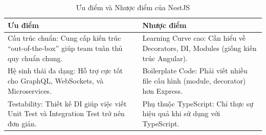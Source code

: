 \documentclass[12pt,a4paper]{report}
\begin{document}
\begin{table}[H]
\centering
\caption{Ưu điểm và Nhược điểm của NestJS}
\label{tab:nestjs_pros_cons}
\begin{tabularx}{\textwidth}{|X|X|}
\hline
\textbf{Ưu điểm} & \textbf{Nhược điểm} \\ \hline
Cấu trúc chuẩn: Cung cấp kiến trúc ``out-of-the-box'' giúp team tuân thủ quy chuẩn chung. & Learning Curve cao: Cần hiểu về Decorators, DI, Modules (giống kiến trúc Angular). \\ \hline
Hệ sinh thái đa dạng: Hỗ trợ cực tốt cho GraphQL, WebSockets, và Microservices. & Boilerplate Code: Phải viết nhiều file cấu hình (module, decorator) hơn Express. \\ \hline
Testability: Thiết kế DI giúp việc viết Unit Test và Integration Test trở nên đơn giản. & Phụ thuộc TypeScript: Chỉ thực sự hiệu quả khi sử dụng với TypeScript. \\ \hline
\end{tabularx}
\end{table}
\end{document}
